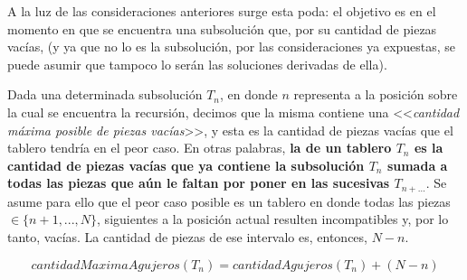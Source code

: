 \documentclass[11pt, a4paper, twoside]{article}
\begin{document}
\begin{paragraph}
A la luz de las consideraciones anteriores surge esta poda: el objetivo es
 en el momento en que se encuentra una
subsolución que, por su cantidad de piezas vacías,  (y ya que no lo es la subsolución, por las consideraciones
ya expuestas, se puede asumir que tampoco lo serán las soluciones derivadas de
ella).

\begin{definicion}

Dada una determinada subsolución $T_n$, en donde $n$ representa a la posición
sobre la cual se encuentra la recursión, decimos que la misma contiene una
<<\emph{cantidad máxima posible de piezas vacías}>>, y esta es la cantidad de
piezas vacías que el tablero tendría en el peor caso. En otras palabras, \textbf{la
 de un tablero $T_n$ es la cantidad de piezas
vacías que ya contiene la subsolución $T_n$ sumada a todas las piezas que aún
le faltan por poner en las sucesivas $T_{n+\dots}$}. Se asume para ello que el
peor caso posible es un tablero en donde todas las piezas $\in \{n+1,...,N\}$,
siguientes a la posición actual resulten incompatibles y, por lo tanto,
vacías. La cantidad de piezas de ese intervalo es, entonces, $N-n$.

\[
cantidadMaximaAgujeros(T_n) = cantidadAgujeros(T_n) + (N-n)
\]

\end{definicion}

\end{paragraph}
\end{document}
